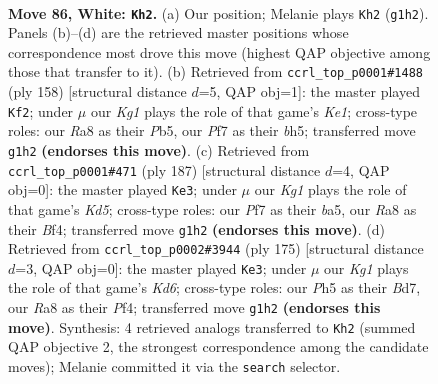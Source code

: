 \documentclass[11pt]{article}
\begin{document}
\clearpage

\begin{figure}[p]\centering
\begin{subfigure}{0.46\textwidth}\centering
\resizebox{\linewidth}{!}{%
\newchessgame
\chessboard[
  setfen={R7/3B1P2/8/7P/1k6/8/8/6K1 w - - 3 86},
  showmover=false,
  pgfstyle=straightmove, color=movearrow, markmove={g1-h2}
]}
\caption{}
\end{subfigure}\hfill
\begin{subfigure}{0.46\textwidth}\centering
\resizebox{\linewidth}{!}{%
\newchessgame
\chessboard[
  setfen={8/8/8/1P1k1p1b/8/8/8/4K1B1 w - - 0 80},
  showmover=false,
  pgfstyle=straightmove, color=movearrow, markmove={e1-f2}
]}
\caption{}
\end{subfigure}
\\[4pt]
\begin{subfigure}{0.46\textwidth}\centering
\resizebox{\linewidth}{!}{%
\newchessgame
\chessboard[
  setfen={8/8/6p1/B7/3k1bp1/8/6K1/8 b - - 21 94},
  showmover=false,
  pgfstyle=straightmove, color=movearrow, markmove={d4-e3}
]}
\caption{}
\end{subfigure}\hfill
\begin{subfigure}{0.46\textwidth}\centering
\resizebox{\linewidth}{!}{%
\newchessgame
\chessboard[
  setfen={8/3b4/8/B6p/5p2/3k4/8/6K1 b - - 23 88},
  showmover=false,
  pgfstyle=straightmove, color=movearrow, markmove={d3-e3}
]}
\caption{}
\end{subfigure}
\caption{\textbf{Move 86, White: \texttt{Kh2}.} (a) Our position; Melanie plays \texttt{Kh2} (\texttt{g1h2}). Panels (b)--(d) are the retrieved master positions whose correspondence most drove this move (highest QAP objective among those that transfer to it). (b) Retrieved from \texttt{ccrl\_top\_p0001\#1488} (ply 158) [structural distance $d$=5, QAP obj=1]: the master played \texttt{Kf2}; under $\mu$ our \emph{Kg1} plays the role of that game's \emph{Ke1}; cross-type roles: our \emph{R}a8 as their \emph{P}b5, our \emph{P}f7 as their \emph{b}h5; transferred move \texttt{g1h2} \textbf{(endorses this move)}. (c) Retrieved from \texttt{ccrl\_top\_p0001\#471} (ply 187) [structural distance $d$=4, QAP obj=0]: the master played \texttt{Ke3}; under $\mu$ our \emph{Kg1} plays the role of that game's \emph{Kd5}; cross-type roles: our \emph{P}f7 as their \emph{b}a5, our \emph{R}a8 as their \emph{B}f4; transferred move \texttt{g1h2} \textbf{(endorses this move)}. (d) Retrieved from \texttt{ccrl\_top\_p0002\#3944} (ply 175) [structural distance $d$=3, QAP obj=0]: the master played \texttt{Ke3}; under $\mu$ our \emph{Kg1} plays the role of that game's \emph{Kd6}; cross-type roles: our \emph{P}h5 as their \emph{B}d7, our \emph{R}a8 as their \emph{P}f4; transferred move \texttt{g1h2} \textbf{(endorses this move)}. Synthesis: 4 retrieved analogs transferred to \texttt{Kh2} (summed QAP objective 2, the strongest correspondence among the candidate moves); Melanie committed it via the \texttt{search} selector.}
\label{fig:thought-m170}
\end{figure}
\end{document}
